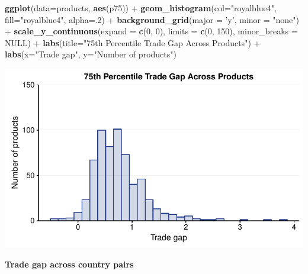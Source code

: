 \documentclass[10pt,]{article}
\newenvironment{Shaded}{\begin{snugshade}}{\end{snugshade}}
\newcommand{\KeywordTok}[1]{\textcolor[rgb]{0.13,0.29,0.53}{\textbf{{#1}}}}
\newcommand{\DataTypeTok}[1]{\textcolor[rgb]{0.13,0.29,0.53}{{#1}}}
\newcommand{\DecValTok}[1]{\textcolor[rgb]{0.00,0.00,0.81}{{#1}}}
\newcommand{\StringTok}[1]{\textcolor[rgb]{0.31,0.60,0.02}{{#1}}}
\newcommand{\OtherTok}[1]{\textcolor[rgb]{0.56,0.35,0.01}{{#1}}}
\newcommand{\NormalTok}[1]{{#1}}
\begin{document}
\begin{Shaded}
\begin{Highlighting}[]
\KeywordTok{ggplot}\NormalTok{(}\DataTypeTok{data=}\NormalTok{products, }\KeywordTok{aes}\NormalTok{(p75)) +}
\StringTok{  }\KeywordTok{geom_histogram}\NormalTok{(}\DataTypeTok{col=}\StringTok{"royalblue4"}\NormalTok{,}
                 \DataTypeTok{fill=}\StringTok{"royalblue4"}\NormalTok{,}
                 \DataTypeTok{alpha=}\NormalTok{.}\DecValTok{2}\NormalTok{) +}
\StringTok{  }\KeywordTok{background_grid}\NormalTok{(}\DataTypeTok{major =} \StringTok{'y'}\NormalTok{, }\DataTypeTok{minor =} \StringTok{"none"}\NormalTok{) +}
\StringTok{  }\KeywordTok{scale_y_continuous}\NormalTok{(}\DataTypeTok{expand =} \KeywordTok{c}\NormalTok{(}\DecValTok{0}\NormalTok{, }\DecValTok{0}\NormalTok{),  }\DataTypeTok{limits =} \KeywordTok{c}\NormalTok{(}\DecValTok{0}\NormalTok{, }\DecValTok{150}\NormalTok{), }\DataTypeTok{minor_breaks =} \OtherTok{NULL}\NormalTok{) +}
\StringTok{  }\KeywordTok{labs}\NormalTok{(}\DataTypeTok{title=}\StringTok{"75th Percentile Trade Gap Across Products"}\NormalTok{) +}
\StringTok{  }\KeywordTok{labs}\NormalTok{(}\DataTypeTok{x=}\StringTok{"Trade gap"}\NormalTok{, }\DataTypeTok{y=}\StringTok{"Number of products"}\NormalTok{)}
\end{Highlighting}
\end{Shaded}

\begin{center}\includegraphics{Figs/value_products-4} \end{center}

\textbf{Trade gap across country pairs}
\end{document}
